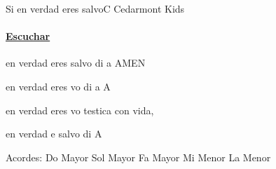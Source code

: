 \documentclass[12pt, spanish]{book}
\newcommand{\NotCCLIed}{\relax}
\begin{document}
    \begin{song}{Si en verdad eres salvo}{C}
        {} %
        {Cedarmont Kids}
        {} %
        {} %
        \ifChordBk
        \paragraph{\mbox{}\hfill\protect\href{https://open.spotify.com/intl-es/track/2GIUHS9WlvoNW4EAVxeLRK}{Escuchar}\mbox{}\hfill}
        \fi


        \begin{SBOpGroup}
             en verdad eres salvo di a AMEN

             en verdad eres vo di a  A

             en verdad eres vo testica con  vida,

             en verdad e salvo di A
        \end{SBOpGroup}

        \ifChordBk
        \begin{SBOpGroup}
            Acordes:
            \upchord{\C}\qquad Do Mayor \hfill
            \upchord{\G}\qquad Sol Mayor \hfill\null\break
            \upchord{\F}\qquad Fa Mayor \hfill
            \upchord{\Em}\qquad Mi Menor \hfill
            \upchord{\Am}\qquad La Menor \hfill\null\break
        \end{SBOpGroup}
        \fi
    \end{song}
\end{document}
